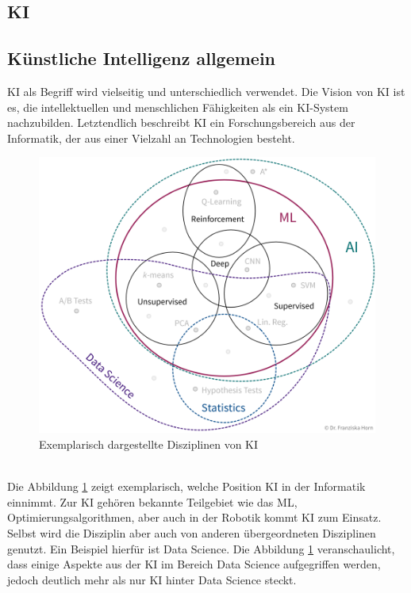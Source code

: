 \begin{onehalfspace}

    \newpage
    \section{\ac{KI}}
    \label{subsec:KIandML}
    \subsection{Künstliche Intelligenz allgemein}
    \label{subsubsec:KIAllgemein}
        \ac{KI} als Begriff wird vielseitig und unterschiedlich verwendet. Die Vision von \ac{KI} ist es, die intellektuellen und menschlichen Fähigkeiten als ein KI-System nachzubilden.\cite{Lis2019} Letztendlich beschreibt \ac{KI} ein Forschungsbereich aus der Informatik, der aus einer Vielzahl an Technologien besteht.\cite{HEGKI2019Definition} 
        \begin{figure}[h]
            \centering
            \includegraphics[width = \textwidth]{Bilder/ml_toolset.png}
            \caption{Exemplarisch dargestellte Disziplinen von \ac{KI}\cite{Horn2022}}
            \label{fig:ml_toolset}
        \end{figure}
        \\
        Die Abbildung \ref*{fig:ml_toolset} zeigt exemplarisch, welche Position \ac*{KI} in der Informatik einnimmt. Zur \ac{KI} gehören bekannte Teilgebiet wie das \ac*{ML}, Optimierungsalgorithmen, aber auch  in der Robotik kommt \ac{KI} zum Einsatz. Selbst wird die Disziplin aber auch von anderen übergeordneten Disziplinen genutzt.\cite{HEGKI2019Definition} Ein Beispiel hierfür ist Data Science. Die Abbildung \ref*{fig:ml_toolset} veranschaulicht, dass einige Aspekte aus der \ac{KI} im Bereich Data Science aufgegriffen werden, jedoch deutlich mehr als nur \ac{KI} hinter Data Science steckt.

\end{onehalfspace}
